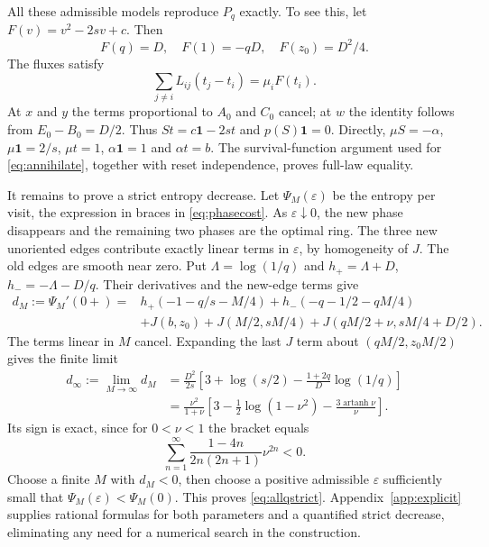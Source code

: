 \documentclass[11pt,a4paper]{article}
\theoremstyle{remark}\newtheorem{remark}[theorem]{Remark}
\newcommand{\one}{\mathbf 1}
\newcommand{\atanh}{\operatorname{artanh}}
\begin{document}
All these admissible models reproduce $P_q$ exactly. To see this, let
$F(v)=v^2-2sv+c$. Then
\begin{equation}
 F(q)=D,\quad F(1)=-qD,\quad F(z_0)=D^2/4.
\end{equation}
The fluxes satisfy
\begin{equation}\label{eq:splitdrift}
 \sum_{j\ne i}L_{ij}(t_j-t_i)=\mu_iF(t_i).
\end{equation}
At $x$ and $y$ the terms proportional to $A_0$ and $C_0$ cancel; at $w$ the
identity follows from $E_0-B_0=D/2$. Thus $St=c\one-2st$ and $p(S)\one=0$.
Directly, $\mu S=-\alpha$, $\mu\one=2/s$, $\mu t=1$,
$\alpha\one=1$ and $\alpha t=b$. The survival-function argument used for
\eqref{eq:annihilate}, together with reset independence, proves full-law
equality.

It remains to prove a strict entropy decrease. Let $\Psi_M(\varepsilon)$
be the entropy per visit, the expression in braces in
\eqref{eq:phasecost}. As $\varepsilon\downarrow0$, the new phase
disappears and the remaining two phases are the optimal ring. The three
new unoriented edges contribute exactly linear terms in $\varepsilon$,
by homogeneity of $J$. The old edges are smooth near zero. Put
$\Lambda=\log(1/q)$ and $h_+=\Lambda+D$, $h_-=-\Lambda-D/q$.
Their derivatives and the new-edge terms give
\begin{align}\label{eq:splitderivative}
 d_M:=\Psi_M'(0+)
 ={}&h_+(-1-q/s-M/4)
      +h_-(-q-1/2-qM/4)\nonumber\\
 &+J(b,z_0)+J(M/2,sM/4)
       +J(qM/2+\nu ,sM/4+D/2).
\end{align}
The terms linear in $M$ cancel. Expanding the last $J$ term about
$(qM/2,z_0M/2)$ gives the finite limit
\begin{align}\label{eq:splitlimit}
 d_\infty:=\lim_{M\to\infty}d_M
 &=\frac{D^2}{2s}
   \left[3+\log(s/2)-\frac{1+2q}{D}\log(1/q)\right]\nonumber\\
 &=\frac{\nu ^2}{1+\nu }
   \left[3-\frac12\log(1-\nu ^2)-\frac{3\atanh \nu }{\nu }\right].
\end{align}
Its sign is exact, since for $0<\nu <1$ the bracket equals
\begin{equation}\label{eq:negativeseries}
 \sum_{n=1}^{\infty}\frac{1-4n}{2n(2n+1)}\nu ^{2n}<0.
\end{equation}
Choose a finite $M$ with $d_M<0$, then choose a positive admissible
$\varepsilon$ sufficiently small that
$\Psi_M(\varepsilon)<\Psi_M(0)$. This proves
\eqref{eq:allqstrict}. Appendix~\ref{app:explicit} supplies rational formulas
for both parameters and a quantified strict decrease, eliminating any need
for a numerical search in the construction.
\end{document}
